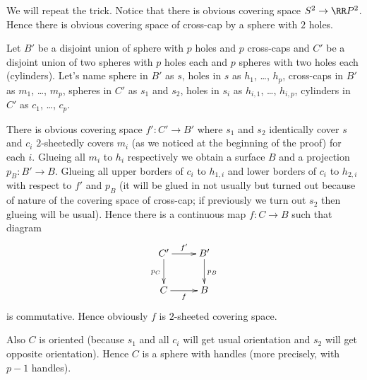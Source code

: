 \documentclass[12pt,a4paper]{article}
\begin{document}
    \begin{problem}{38}
        We will repeat the trick. Notice that there is obvious covering space $S^2 \to \RR P^2$. Hence there is obvious covering space of cross-cap by a sphere with $2$ holes.

        Let $B'$ be a disjoint union of sphere with $p$ holes and $p$ cross-caps and $C'$ be a disjoint union of two spheres with $p$ holes each and $p$ spheres with two holes each (cylinders). Let's name sphere in $B'$ as $s$, holes in $s$ as $h_1$, \dots, $h_p$, cross-caps in $B'$ as $m_1$, \dots, $m_p$, spheres in $C'$ as $s_1$ and $s_2$, holes in $s_i$ as $h_{i, 1}$, \dots, $h_{i, p}$, cylinders in $C'$ as $c_1$, \dots, $c_p$.

        There is obvious covering space $f': C' \to B'$ where $s_1$ and $s_2$ identically cover $s$ and $c_i$ $2$-sheetedly covers $m_i$ (as we noticed at the beginning of the proof) for each $i$. Glueing all $m_i$ to $h_i$ respectively we obtain a surface $B$ and a projection $p_B: B' \to B$. Glueing all upper borders of $c_i$ to $h_{1, i}$ and lower borders of $c_i$ to $h_{2, i}$ with respect to $f'$ and $p_B$ (it will be glued in not usually but turned out because of nature of the covering space of cross-cap; if previously we turn out $s_2$ then glueing will be usual). Hence there is a continuous map $f: C \to B$ such that diagram
        \[
            \xymatrix{
                C' \ar[r]^{f'} \ar[d]_{p_C} & B' \ar[d]^{p_B}\\
                C \ar[r]_{f} & B\\
            }
        \]
        is commutative. Hence obviously $f$ is $2$-sheeted covering space.

        Also $C$ is oriented (because $s_1$ and all $c_i$ will get usual orientation and $s_2$ will get opposite orientation). Hence $C$ is a sphere with handles (more precisely, with $p-1$ handles).
    \end{problem}
\end{document}
